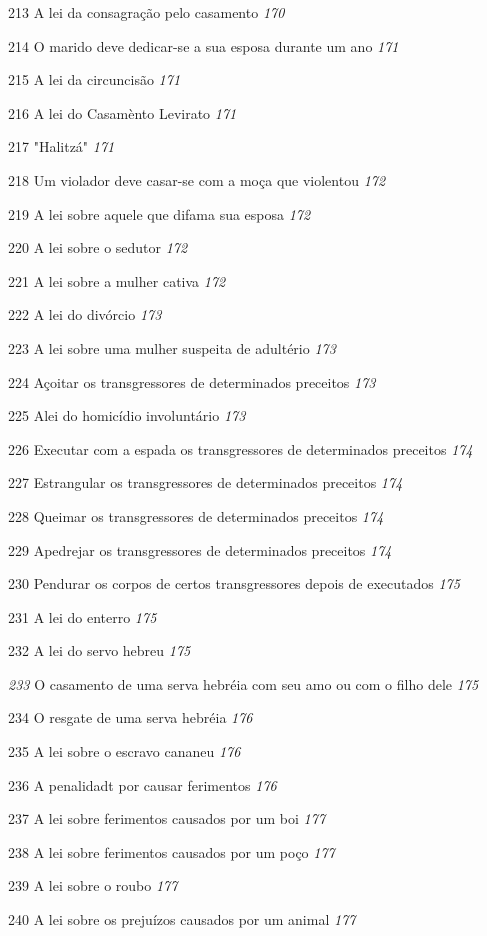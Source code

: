 213 A lei da consagração pelo casamento \emph{170}

214 O marido deve dedicar-se a sua esposa durante um ano \emph{171}

215 A lei da circuncisão \emph{171}

216 A lei do Casamènto Levirato \emph{171}

217 "Halitzá" \emph{171}

218 Um violador deve casar-se com a moça que violentou \emph{172}

219 A lei sobre aquele que difama sua esposa \emph{172}

220 A lei sobre o sedutor \emph{172}

221 A lei sobre a mulher cativa \emph{172}

222 A lei do divórcio \emph{173}

223 A lei sobre uma mulher suspeita de adultério \emph{173}

224 Açoitar os transgressores de determinados preceitos \emph{173}

225 Alei do homicídio involuntário \emph{173}

226 Executar com a espada os transgressores de determinados preceitos
\emph{174}

227 Estrangular os transgressores de determinados preceitos \emph{174}

228 Queimar os transgressores de determinados preceitos \emph{174}

229 Apedrejar os transgressores de determinados preceitos \emph{174}

230 Pendurar os corpos de certos transgressores depois de executados
\emph{175}

231 A lei do enterro \emph{175}

232 A lei do servo hebreu \emph{175}

\emph{233} O casamento de uma serva hebréia com seu amo ou com o filho
dele \emph{175}

234 O resgate de uma serva hebréia \emph{176}

235 A lei sobre o escravo cananeu \emph{176}

236 A penalidadt por causar ferimentos \emph{176}

237 A lei sobre ferimentos causados por um boi \emph{177}

238 A lei sobre ferimentos causados por um poço \emph{177}

239 A lei sobre o roubo \emph{177}

240 A lei sobre os prejuízos causados por um animal \emph{177}


